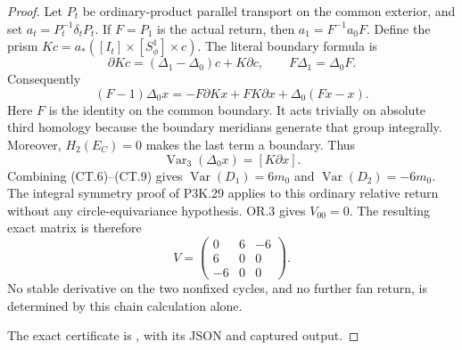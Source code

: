\begin{proof}
Let \(P_t\) be ordinary-product parallel transport on the common
exterior, and set \(a_t=P_t^{-1}\delta_tP_t\). If \(F=P_1\) is
the actual return, then \(a_1=F^{-1}a_0F\). Define the prism
\(Kc=a_*([I_t]\times[S^1_\phi]\times c)\). The literal boundary
formula is
\[
 \partial Kc=(\Delta_1-\Delta_0)c+K\partial c,
          \qquad F\Delta_1=\Delta_0F.                 \tag{CT.8}
\]
Consequently
\[
 (F-1)\Delta_0x
 =-F\partial Kx+F K\partial x+\Delta_0(Fx-x).
\]
Here \(F\) is the identity on the common boundary. It acts trivially
on absolute third homology because the boundary meridians generate
that group integrally. Moreover,
\(H_2(E_C)=0\) makes the last term a boundary. Thus
\[
             \operatorname{Var}_3(\Delta_0x)
                           =[K\partial x].            \tag{CT.9}
\]
Combining (CT.6)--(CT.9) gives
\(\operatorname{Var}(D_1)=6m_0\) and
\(\operatorname{Var}(D_2)=-6m_0\). The integral symmetry proof
of P3K.29 applies to this ordinary relative return without any
circle-equivariance hypothesis. OR.3 gives \(V_{00}=0\).
The resulting exact matrix is therefore
\[
 V=\begin{pmatrix}0&6&-6\\6&0&0\\-6&0&0\end{pmatrix}. \tag{CT.10}
\]
No stable derivative on the two nonfixed cycles, and no further fan
return, is determined by this chain calculation alone.

The exact certificate is , with its JSON and captured output.
\end{proof}